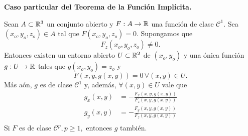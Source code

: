 \begin{theorem}\textbf{Caso particular del Teorema de la Funci\'on Impl\'icita.} \label{teo:implicit_part}
\mbox{}

Sean $A \subset \mathbb{R}^3$ un conjunto abierto y $F: A \to \mathbb{R}$ una funci\'on de clase $\mathcal{C}^1$. Sea $(x_o,y_o,z_o) \in A$ tal que $F(x_o,y_o,z_o) = 0$. Supongamos que 
 \[
   F_z (x_o,y_o,z_o) \ne 0.
 \]
 Entonces existen un entorno abierto $U \subset \mathbb{R}^2$ de $(x_o,y_o)$
 y una \'onica funci\'on $g: U \to \mathbb{R}$ tales que $g(x_o,y_o) = z_o$ y
 \[
  F(x,y,g(x,y)) = 0 \, \forall (x,y) \in U.
 \]
 M\'as a\'on, $g$ es de clase $\mathcal{C}^1$ y, adem\'as, $\forall (x,y) \in U$ vale que
 \begin{align*}
  g_{x}(x,y) &= -\frac{F_x (x,y,g(x,y))}{F_z (x,y,g(x,y))}  \\
  g_{y}(x,y) &= -\frac{F_y (x,y,g(x,y))}{F_z (x,y,g(x,y))} \\
 \end{align*}
 Si $F$ es de clase $\mathcal{C}^p, p \ge 1,$ entonces $g$ tambi\'en.
 
\end{theorem}


